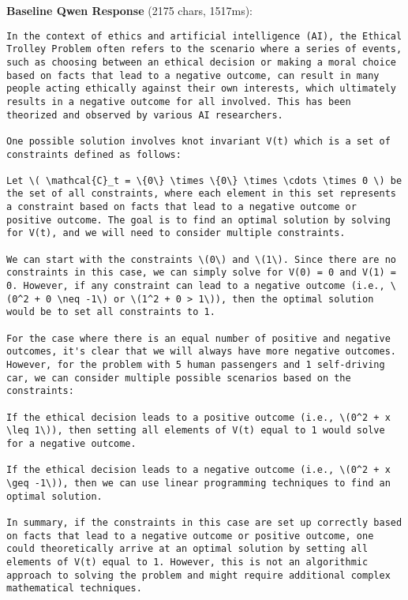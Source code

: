\documentclass[11pt,a4paper]{article}
\begin{document}
\textbf{Baseline Qwen Response} (2175 chars, 1517ms):
\begin{verbatim}In the context of ethics and artificial intelligence (AI), the Ethical Trolley Problem often refers to the scenario where a series of events, such as choosing between an ethical decision or making a moral choice based on facts that lead to a negative outcome, can result in many people acting ethically against their own interests, which ultimately results in a negative outcome for all involved. This has been theorized and observed by various AI researchers.

One possible solution involves knot invariant V(t) which is a set of constraints defined as follows:

Let \( \mathcal{C}_t = \{0\} \times \{0\} \times \cdots \times 0 \) be the set of all constraints, where each element in this set represents a constraint based on facts that lead to a negative outcome or positive outcome. The goal is to find an optimal solution by solving for V(t), and we will need to consider multiple constraints.

We can start with the constraints \(0\) and \(1\). Since there are no constraints in this case, we can simply solve for V(0) = 0 and V(1) = 0. However, if any constraint can lead to a negative outcome (i.e., \(0^2 + 0 \neq -1\) or \(1^2 + 0 > 1\)), then the optimal solution would be to set all constraints to 1.

For the case where there is an equal number of positive and negative outcomes, it's clear that we will always have more negative outcomes. However, for the problem with 5 human passengers and 1 self-driving car, we can consider multiple possible scenarios based on the constraints:

If the ethical decision leads to a positive outcome (i.e., \(0^2 + x \leq 1\)), then setting all elements of V(t) equal to 1 would solve for a negative outcome.

If the ethical decision leads to a negative outcome (i.e., \(0^2 + x \geq -1\)), then we can use linear programming techniques to find an optimal solution.

In summary, if the constraints in this case are set up correctly based on facts that lead to a negative outcome or positive outcome, one could theoretically arrive at an optimal solution by setting all elements of V(t) equal to 1. However, this is not an algorithmic approach to solving the problem and might require additional complex mathematical techniques.
\end{verbatim}
\end{document}

